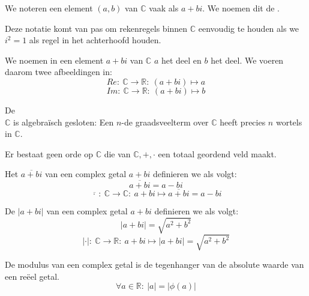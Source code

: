 \documentclass[main.tex]{subfiles}
\begin{document}
\begin{de}
  We noteren een element $(a,b)$ van $\mathbb{C}$ vaak als $a+bi$.
  We noemen dit de .
\end{de}

\begin{opm}
  Deze notatie komt van pas om rekenregels binnen $\mathbb{C}$ eenvoudig te houden als we $i^{2}=1$ als regel in het achterhoofd houden. 
\end{opm}

\begin{de}
  We noemen in een element $a+bi$ van $\mathbb{C}$ $a$ het  deel en $b$ het  deel.
  We voeren daarom twee afbeeldingen in:
  \[ Re:\ \mathbb{C} \rightarrow \mathbb{R}:\ (a+bi) \mapsto a \]
  \[ Im:\ \mathbb{C} \rightarrow \mathbb{R}:\ (a+bi) \mapsto b \]
\end{de}

\begin{st}
  De \\
  $\mathbb{C}$ is algebra\"isch gesloten: Een $n$-de graadsveelterm over $\mathbb{C}$ heeft precies $n$ wortels in $\mathbb{C}$.
\zb
\end{st}

\begin{pr}
  Er bestaat geen orde op $\mathbb{C}$ die van $\mathbb{C},+,\cdot$ een totaal geordend veld maakt.
\end{pr}

\begin{de}
  Het  $\overline{a+bi}$ van een complex getal $a+bi$ definieren we als volgt:
  \[ \overline{a+bi} = a-bi \]
  \[ \overline{\, \cdot\ }:\ \mathbb{C} \rightarrow \mathbb{C}:\ a+bi \mapsto \overline{a+bi} = a-bi \]
\end{de}

\begin{de}
  De  $|a+bi|$ van een complex getal $a+bi$ definieren we als volgt:
  \[ |a+bi| = \sqrt{a^{2}+b^{2}} \]
  \[ |\cdot|:\ \mathbb{C} \rightarrow \mathbb{R}:\ a+bi \mapsto |a+bi| = \sqrt{a^{2}+b^{2}} \]
\end{de}

\begin{ei}
  De modulus van een complex getal is de tegenhanger van de absolute waarde van een re\"eel getal.
  \[ \forall a \in \mathbb{R}:\ |a| = |\phi(a)| \]
\end{ei}
\end{document}
